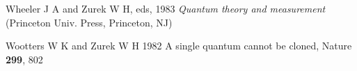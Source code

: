 \documentclass{article}
\begin{document}
\begin{thebibliography}{12}
% 
% 
% 
% 
% 
% 
% 
% 
% 
% 
% 
% 
% 
% 
% 
% 
% 
% 
% 
% 
% 
% 

Wheeler J A and Zurek W H, eds, 1983
{\em Quantum theory and measurement}
(Princeton Univ. Press, Princeton, NJ)


% 


Wootters W K and Zurek W H 1982
A single quantum cannot be cloned,
Nature {\bf 299}, 802

% 
% 
% 
% 
% 
% 
% 




\end{thebibliography}
\end{document}
